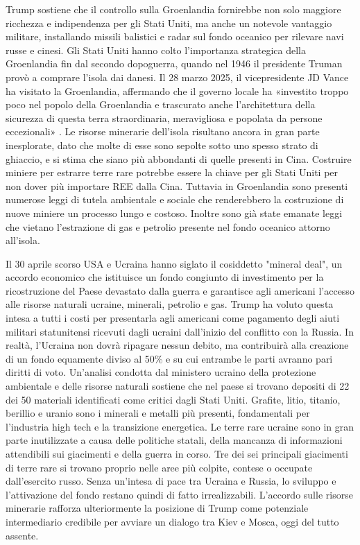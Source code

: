 \documentclass[12pt,a4paper,oneside]{book}
\begin{document}
Trump sostiene che il controllo sulla Groenlandia fornirebbe non solo maggiore ricchezza e indipendenza per gli Stati Uniti, ma anche un notevole vantaggio militare, installando missili balistici e radar sul fondo oceanico per rilevare navi russe e cinesi.
Gli Stati Uniti hanno colto l'importanza strategica della Groenlandia fin dal secondo dopoguerra, quando nel 1946 il presidente Truman provò a comprare l'isola dai danesi. Il 28 marzo 2025, il vicepresidente JD Vance ha visitato la Groenlandia, affermando che il governo locale ha «investito troppo poco nel popolo della Groenlandia e trascurato anche l'architettura della sicurezza di questa terra straordinaria, meravigliosa e popolata da persone eccezionali» \cite{foxnews2024greenland}.
Le risorse minerarie dell'isola risultano ancora in gran parte inesplorate, dato che molte di esse sono sepolte sotto uno spesso strato di ghiaccio, e si stima che siano più abbondanti di quelle presenti in Cina. Costruire miniere per estrarre terre rare potrebbe essere la chiave per gli Stati Uniti per non dover più importare REE dalla Cina.
Tuttavia in Groenlandia sono presenti numerose leggi di tutela ambientale e sociale che renderebbero la costruzione di nuove miniere un processo lungo e costoso. Inoltre sono già state emanate leggi che vietano l'estrazione di gas e petrolio presente nel fondo oceanico attorno all'isola.

Il 30 aprile scorso USA e Ucraina hanno siglato il cosiddetto "mineral deal", un accordo economico che istituisce un fondo congiunto di investimento per la ricostruzione del Paese devastato dalla guerra e garantisce agli americani l'accesso alle risorse naturali ucraine, minerali, petrolio e gas. Trump ha voluto questa intesa a tutti i costi per presentarla agli americani come pagamento degli aiuti militari statunitensi ricevuti dagli ucraini dall'inizio del conflitto con la Russia. In realtà, l'Ucraina non dovrà ripagare nessun debito, ma contribuirà alla creazione di un fondo equamente diviso al 50\% e su cui entrambe le parti avranno pari diritti di voto.
Un'analisi condotta dal ministero ucraino della protezione ambientale e delle risorse naturali sostiene che nel paese si trovano depositi di 22 dei 50 materiali identificati come critici dagli Stati Uniti. Grafite, litio, titanio, berillio e uranio sono i minerali e metalli più presenti, fondamentali per l'industria high tech e la transizione energetica. Le terre rare ucraine sono in gran parte inutilizzate a causa delle politiche statali, della mancanza di informazioni attendibili sui giacimenti e della guerra in corso. Tre dei sei principali giacimenti di terre rare si trovano proprio nelle aree più colpite, contese o occupate dall'esercito russo.
Senza un'intesa di pace tra Ucraina e Russia, lo sviluppo e l'attivazione del fondo restano quindi di fatto irrealizzabili. L'accordo sulle risorse minerarie rafforza ulteriormente la posizione di Trump come potenziale intermediario credibile per avviare un dialogo tra Kiev e Mosca, oggi del tutto assente.
\end{document}
